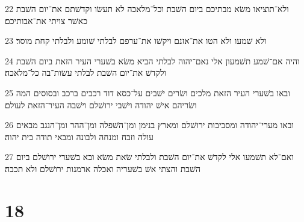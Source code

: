 \par 22 ולא־תוציאו משׂא מבתיכם ביום השׁבת וכל־מלאכה לא תעשׂו וקדשׁתם את־יום השׁבת כאשׁר צויתי את־אבותיכם׃
\par 23 ולא שׁמעו ולא הטו את־אזנם ויקשׁו את־ערפם לבלתי שׁומע ולבלתי קחת מוסר׃
\par 24 והיה אם־שׁמע תשׁמעון אלי נאם־יהוה לבלתי הביא משׂא בשׁערי העיר הזאת ביום השׁבת ולקדשׁ את־יום השׁבת לבלתי עשׂות־בה כל־מלאכה׃
\par 25 ובאו בשׁערי העיר הזאת מלכים ושׂרים ישׁבים על־כסא דוד רכבים ברכב ובסוסים המה ושׂריהם אישׁ יהודה וישׁבי ירושׁלם וישׁבה העיר־הזאת לעולם׃
\par 26 ובאו מערי־יהודה ומסביבות ירושׁלם ומארץ בנימן ומן־השׁפלה ומן־ההר ומן־הנגב מבאים עולה וזבח ומנחה ולבונה ומבאי תודה בית יהוה׃
\par 27 ואם־לא תשׁמעו אלי לקדשׁ את־יום השׁבת ולבלתי שׂאת משׂא ובא בשׁערי ירושׁלם ביום השׁבת והצתי אשׁ בשׁעריה ואכלה ארמנות ירושׁלם ולא תכבה׃

\chapter{18}

